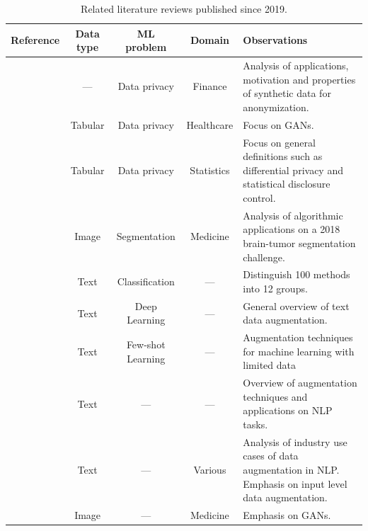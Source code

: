 \documentclass[parskip=full]{scrartcl}
\begin{document}
\begin{table}[t!]
    \centering
    \caption{\label{tab:literature-reviews}
        Related literature reviews published since 2019.
    }
    \small{%
    \begin{tabularx}{\textwidth}{@{}rcccX@{}}
        \toprule
        Reference & Data type & ML problem & Domain & Observations \\
        \midrule

        \citet{assefa2020generating} & --- & Data privacy &
        Finance & Analysis of applications, motivation and properties of
        synthetic data for anonymization. \\

        \citet{hernandez2022synthetic} & Tabular & Data privacy &
        Healthcare & Focus on GANs. \\

        \citet{raghunathan2021synthetic} & Tabular & Data privacy &
        Statistics & Focus on general definitions such as differential privacy
        and statistical disclosure control.\\

        \citet{nalepa2019data} & Image & Segmentation & Medicine & Analysis of
        algorithmic applications on a 2018 brain-tumor segmentation
        challenge.\\

        \citet{bayer2021survey} & Text & Classification & --- & Distinguish
        100 methods into 12 groups. \\

        \citet{shorten2021text} & Text & Deep Learning & --- & General
        overview of text data augmentation. \\

        \citet{chen2021empirical} & Text & Few-shot Learning & --- &
        Augmentation techniques for machine learning with limited data\\

        \citet{feng2021survey} & Text & --- & --- & Overview of augmentation
        techniques and applications on NLP tasks.\\

        \citet{liu2020survey} & Text & --- & Various & Analysis of industry
        use cases of data augmentation in NLP\@. Emphasis on input level data
        augmentation.\\

        \citet{yi2019generative} & Image & --- & Medicine & Emphasis on GANs.\\


\end{tabularx}}
\end{table}
\end{document}
